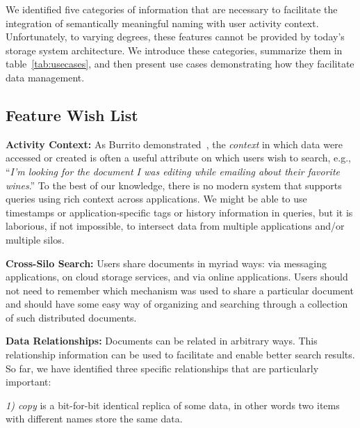 
We identified five categories of information that are necessary to facilitate the integration of semantically meaningful naming with user activity context.
Unfortunately, to varying degrees, these features cannot be provided by today's storage system architecture.
We introduce these categories, summarize them in table~\autoref{tab:usecases},
and then present use cases demonstrating how they facilitate data management.

\subsection{Feature Wish List}
\label{sec:features}
\noindent\textbf{Activity Context: }
As Burrito demonstrated~\cite{guo2012burrito}, the \emph{context} in which data were accessed or created is often a useful attribute on which users wish to search, e.g., ``\emph{I'm looking for the document I was editing while emailing \persa about their favorite wines}.''
To the best of our knowledge, there is no modern system that supports queries using rich context across applications. 
We might be able to use timestamps or application-specific tags or history information in queries, but it is laborious, if not impossible, to intersect data from multiple applications and/or multiple silos.

\noindent\textbf{Cross-Silo Search: }
Users share documents in myriad ways: via messaging applications, on cloud storage services, and via online applications. Users should not need to remember which mechanism was used to share a particular document and should have some easy way of organizing and searching through a collection of such distributed documents.

\noindent\textbf{Data Relationships: }
Documents can be related in arbitrary ways. This relationship information can be used to facilitate and enable better search results. So far, we have identified three specific relationships that are particularly important: 

\noindent\emph{1) copy} is a bit-for-bit identical replica of some data, in other words two items with different names store the same data.

